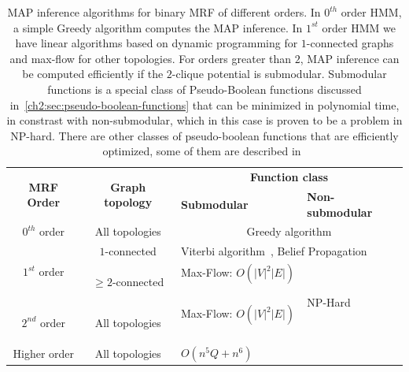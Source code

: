 \begin{table}
\center
\scriptsize
\begin{tabular}{|c|c|m{14em}|m{10em}|}
\hline
\multirow{2}{*}{\textbf{MRF Order}} & \multirow{2}{*}{\textbf{Graph topology}} & \multicolumn{2}{c|}{\textbf{Function class}} \\
\cline{3-4}
&   & \textbf{Submodular} & \textbf{Non-submodular} \\
\hline
$0^{th}$ order & All topologies & \multicolumn{2}{c|}{Greedy algorithm} \\
\hline
\multirow{2}{*}{$1^{st}$ order} & $1$-connected & \multicolumn{2}{m{24em}|}{Viterbi algorithm~\cite{viterbi67}, Belief Propagation~\cite{pearl82}} \\
\cline{2-4}
& $\geq 2$-connected & Max-Flow: $\scriptstyle O(|V|^2|E|)$~\cite{kolmogorov04whatenergies} & \multirow{2}{=}[-2mm]{NP-Hard~\cite{nemhauser81}} \\
\cline{1-3}
$2^{nd}$ order & All topologies & Max-Flow: $\scriptstyle O(|V|^2|E|)$~\cite{billionnet85} & \\
\cline{1-3}
Higher order & All topologies & $O(n^5Q + n^6)$~\cite{orlin09faster} & \\
\hline
\end{tabular}
\caption{MAP inference algorithms for binary MRF of different orders. In $0^{th}$ order HMM, a simple Greedy algorithm computes the MAP inference. In $1^{st}$ order HMM we have linear algorithms based on dynamic programming for $1$-connected graphs and max-flow for other topologies. For orders greater than $2$, MAP inference can be computed efficiently if the $2$-clique potential is submodular. Submodular functions is a special class of Pseudo-Boolean functions discussed in~\cref{ch2:sec:pseudo-boolean-functions} that can be minimized in polynomial time, in constrast with non-submodular, which in this case is proven to be a problem in NP-hard. There are other classes of pseudo-boolean functions that are efficiently optimized, some of them are described in~\cite{boros02pseudo}   }
\label{ch2:tab:map-inference-binary-mrf}
\end{table}



